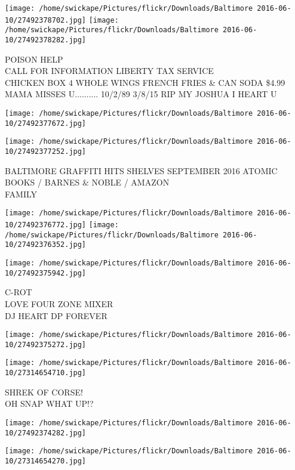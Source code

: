 \documentclass[10pt,letterpaper]{article}
\begin{document}
\texttt{[image: /home/swickape/Pictures/flickr/Downloads/Baltimore 2016-06-10/27492378702.jpg]}
\texttt{[image: /home/swickape/Pictures/flickr/Downloads/Baltimore 2016-06-10/27492378282.jpg]}

POISON HELP\\
CALL FOR INFORMATION LIBERTY TAX SERVICE\\
CHICKEN BOX 4 WHOLE WINGS FRENCH FRIES \& CAN SODA \$4.99\\
MAMA MISSES U.......... 10/2/89 3/8/15 RIP MY JOSHUA I HEART U\\
\pagebreak

\texttt{[image: /home/swickape/Pictures/flickr/Downloads/Baltimore 2016-06-10/27492377672.jpg]}

\vspace{0.25in}
\texttt{[image: /home/swickape/Pictures/flickr/Downloads/Baltimore 2016-06-10/27492377252.jpg]}

BALTIMORE GRAFFITI HITS SHELVES SEPTEMBER 2016 ATOMIC BOOKS / BARNES \& NOBLE / AMAZON\\
FAMILY\\
\pagebreak

\texttt{[image: /home/swickape/Pictures/flickr/Downloads/Baltimore 2016-06-10/27492376772.jpg]}
\texttt{[image: /home/swickape/Pictures/flickr/Downloads/Baltimore 2016-06-10/27492376352.jpg]}

\texttt{[image: /home/swickape/Pictures/flickr/Downloads/Baltimore 2016-06-10/27492375942.jpg]}

C{-}ROT\\
LOVE FOUR ZONE MIXER\\
DJ HEART DP FOREVER\\
\pagebreak

\texttt{[image: /home/swickape/Pictures/flickr/Downloads/Baltimore 2016-06-10/27492375272.jpg]}

\vspace{0.25in}
\texttt{[image: /home/swickape/Pictures/flickr/Downloads/Baltimore 2016-06-10/27314654710.jpg]}

SHREK OF CORSE!\\
OH SNAP WHAT UP!?\\
\pagebreak

\texttt{[image: /home/swickape/Pictures/flickr/Downloads/Baltimore 2016-06-10/27492374282.jpg]}

\vspace{0.25in}
\texttt{[image: /home/swickape/Pictures/flickr/Downloads/Baltimore 2016-06-10/27314654270.jpg]}
\end{document}
